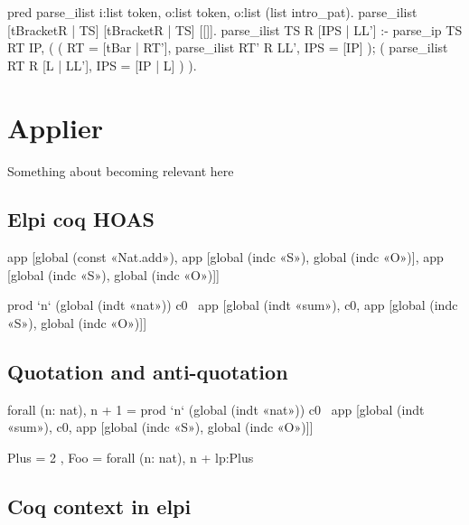\documentclass[thesis.tex]{subfiles}
\begin{document}
{\begin{elpicode}
  pred parse_ilist i:list token, o:list token, o:list (list intro_pat).
  parse_ilist [tBracketR | TS] [tBracketR | TS] [[]].
  parse_ilist TS R [IPS | LL'] :-
    parse_ip TS RT IP,
    (
      (
        RT = [tBar | RT'],
        parse_ilist RT' R LL',
        IPS = [IP]
      );
      (
        parse_ilist RT R [L | LL'],
        IPS = [IP | L]
      )
    ).
\end{elpicode}

\section{Applier}\label{ssec:applier}
Something about \ce becoming relevant here
\subsection{Elpi coq HOAS}
\begin{elpicode}
  app [global (const «Nat.add»), 
      app [global (indc «S»), global (indc «O»)], 
      app [global (indc «S»), global (indc «O»)]]
\end{elpicode}

\begin{elpicode}
  prod `n` (global (indt «nat»)) c0 \ 
      app [global (indt «sum»), 
           c0, 
           app [global (indc «S»), global (indc «O»)]]
\end{elpicode}

\subsection{Quotation and anti-quotation}
\begin{elpicode}
  {{ forall (n: nat), n + 1 }} =
    prod `n` (global (indt «nat»)) c0 \ 
        app [global (indt «sum»), 
            c0, 
            app [global (indc «S»), global (indc «O»)]]
\end{elpicode}

\begin{elpicode}
  Plus = {{ 2 }},
  Foo = {{ forall (n: nat), n + lp:Plus }}
\end{elpicode}
\subsection{Coq context in elpi}
}
\end{document}
